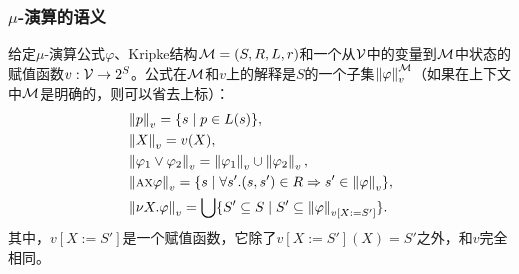 \documentclass[9pt, CJK]{beamer}
\begin{document}
\begin{frame}
	\frametitle{$\mu$-演算的语义}
	{\footnotesize 
	\begin{definition}
		给定$\mu$-演算公式$\varphi$、Kripke结构${\cal M}=(S,R,L,r)$和一个从${\cal V}$中的变量到${\cal M}$中状态的赋值函数$v: {\cal V} \rightarrow 2^S$。公式在${\cal M}$和$v$上的解释是$S$的一个子集$\left\| \varphi\right\|_v^{{\cal M}}$（如果在上下文中${\cal M}$是明确的，则可以省去上标）：
		\begin{align*}
			& \left \| p\right \|_v = \{s\mid p \in L(s)\}, \\  
			& \left\| X\right\|_v = v(X),\\
			& \left\|\varphi_1 \vee \varphi_2\right\|_v = \left\|\varphi_1\right\|_v \cup \left\|\varphi_2\right\|_v,\\ 
			& \left\|\textsc{a} \textsc{x} \varphi\right\|_v = \{s\mid \forall s'. (s, s') \in R \Rightarrow s' \in \left\|\varphi\right\|_v\},\\ 
			& \left\| \nu X. \varphi\right\|_v = \bigcup\{S' \subseteq S \mid S' \subseteq \left\|\varphi\right\|_{v[X:= S']}\}.
		\end{align*}
		其中，$v[X:= S']$是一个赋值函数，它除了$v[X:= S'](X)=S'$之外，和$v$完全相同。
	\end{definition}
}
\end{frame}
\end{document}
